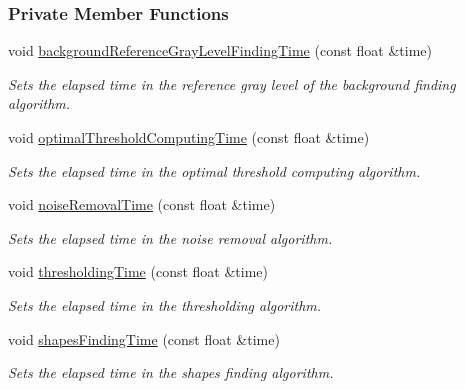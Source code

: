 \subsubsection*{Private Member Functions}
\begin{CompactItemize}
\item 
void \hyperlink{class_statistics_5c9fede192f06bc757d18336dfcf84cf}{backgroundReferenceGrayLevelFindingTime} (const float \&time)
\begin{CompactList}\small\item\em Sets the elapsed time in the reference gray level of the background finding algorithm. \item\end{CompactList}\item 
void \hyperlink{class_statistics_90380f820c043813aafb85c1dc9a6393}{optimalThresholdComputingTime} (const float \&time)
\begin{CompactList}\small\item\em Sets the elapsed time in the optimal threshold computing algorithm. \item\end{CompactList}\item 
void \hyperlink{class_statistics_dc21ff96ff4ddda9384eb03ac6de20de}{noiseRemovalTime} (const float \&time)
\begin{CompactList}\small\item\em Sets the elapsed time in the noise removal algorithm. \item\end{CompactList}\item 
void \hyperlink{class_statistics_97e33cf2670cb908646fe01b8f1d719a}{thresholdingTime} (const float \&time)
\begin{CompactList}\small\item\em Sets the elapsed time in the thresholding algorithm. \item\end{CompactList}\item 
void \hyperlink{class_statistics_e380b6d86bb2feeaabba147f731aac73}{shapesFindingTime} (const float \&time)
\begin{CompactList}\small\item\em Sets the elapsed time in the shapes finding algorithm. \item\end{CompactList}\end{CompactItemize}
